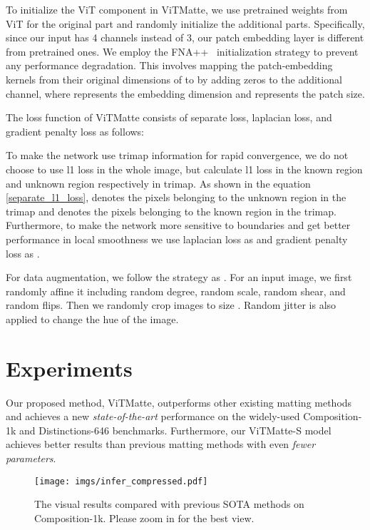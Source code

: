 \documentclass[10pt,twocolumn,letterpaper]{article}
\newcommand{\thename}{ViTMatte}
\begin{document}
To initialize the ViT component in \thename{}, we use pretrained weights from ViT for the original part and randomly initialize the additional parts. Specifically, since our input  has 4 channels instead of 3, our patch embedding layer is different from pretrained ones. We employ the FNA++~\cite{fna++} initialization strategy to prevent any performance degradation. This involves mapping the patch-embedding kernels from their original dimensions of  to  by adding zeros to the additional channel, where  represents the embedding dimension and  represents the patch size.

The loss function of \thename{} consists of separate  loss, laplacian loss, and gradient penalty loss as follows:





To make the network use trimap information for rapid convergence, we do not choose to use l1 loss in the whole image, but calculate l1 loss in the known region and unknown region respectively in trimap. As shown in the equation \eqref{separate_l1_loss},  denotes the pixels belonging to the unknown region in the trimap and  denotes the pixels belonging to the known region in the trimap. Furthermore, to make the network more sensitive to boundaries and get better performance in local smoothness we use laplacian loss as \cite{CAM} and gradient penalty loss as \cite{rmat}.

For data augmentation, we follow the strategy as \cite{GCAMatting}. For an input image, we first randomly affine it including random degree, random scale, random shear, and random flips. Then we randomly crop images to size . Random jitter is also applied to change the hue of the image.

\section{Experiments}
Our proposed method, \thename{}, outperforms other existing matting methods and achieves a new \emph{state-of-the-art} performance on the widely-used Composition-1k and Distinctions-646 benchmarks. Furthermore, our \thename{}-S model achieves better results than previous matting methods with even \emph{fewer parameters}.

\begin{figure*}[htp]
  \centering
    \texttt{[image: imgs/infer\_compressed.pdf]}
  \caption{The visual results compared with previous SOTA methods on Composition-1k. Please zoom in for the best view.}
  \label{fig:infer}
\end{figure*}
\end{document}
